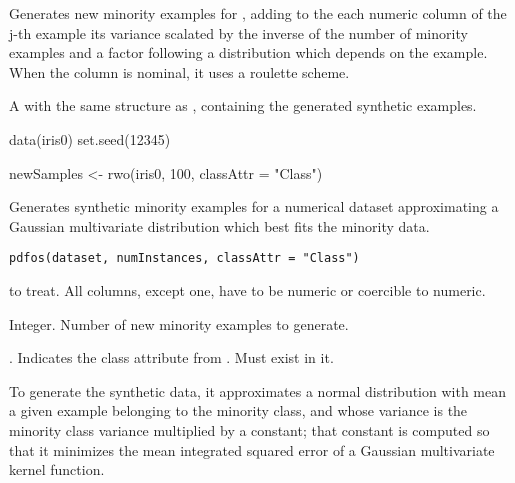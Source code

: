 %
\begin{Details}\relax
Generates  new minority examples for ,
adding to the each numeric column of the j-th example its variance scalated
by the inverse of the number of minority examples and a factor following a
 distribution which depends on the example. When the column is
nominal, it uses a roulette scheme.
\end{Details}
%
\begin{Value}
A  with the same structure as ,
containing the generated synthetic examples.
\end{Value}
%
%
\begin{Examples}
\begin{ExampleCode}
data(iris0)
set.seed(12345)

newSamples <- rwo(iris0, 100, classAttr = "Class")

\end{ExampleCode}
\end{Examples}
%
\begin{Description}\relax
Generates synthetic minority examples for a numerical dataset approximating a
Gaussian multivariate distribution which best fits the minority data.
\end{Description}
%
\begin{Usage}
\begin{verbatim}
pdfos(dataset, numInstances, classAttr = "Class")
\end{verbatim}
\end{Usage}
%
\begin{Arguments}
\begin{ldescription}
\item[\code{dataset}]  to treat. All columns, except
 one, have to be numeric or coercible to numeric.

\item[\code{numInstances}] Integer. Number of new minority examples to generate.

\item[\code{classAttr}] . Indicates the class attribute from
. Must exist in it.
\end{ldescription}
\end{Arguments}
%
\begin{Details}\relax
To generate the synthetic data, it approximates a normal distribution with
mean a given example belonging to the minority class, and whose variance is
the minority class variance multiplied by a constant; that constant is
computed so that it minimizes the mean integrated squared error of a Gaussian
multivariate kernel function.
\end{Details}
